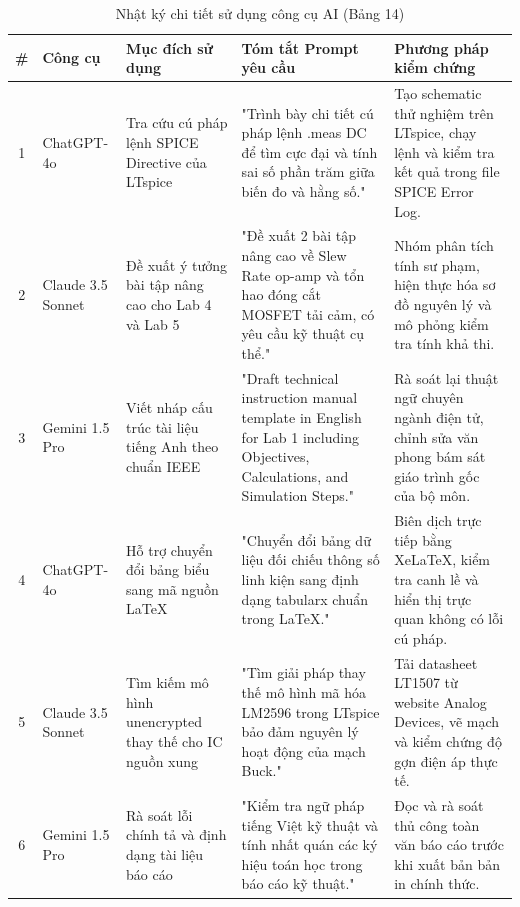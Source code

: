 \documentclass[12pt,a4paper]{report}
\begin{document}
\begin{table}[H]
\centering
\caption{Nhật ký chi tiết sử dụng công cụ AI (Bảng 14)}
\label{tab:ai_log}
\renewcommand{\arraystretch}{1.3}
\small
\begin{tabularx}{\textwidth}{|c|p{2.0cm}|p{3.2cm}|X|p{3.8cm}|}
\hline
\rowcolor{codebg}
\textbf{\#} & \textbf{Công cụ} & \textbf{Mục đích sử dụng} & \textbf{Tóm tắt Prompt yêu cầu} & \textbf{Phương pháp kiểm chứng} \\ \hline
1 & ChatGPT-4o & Tra cứu cú pháp lệnh SPICE Directive của LTspice & "Trình bày chi tiết cú pháp lệnh .meas DC để tìm cực đại và tính sai số phần trăm giữa biến đo và hằng số." & Tạo schematic thử nghiệm trên LTspice, chạy lệnh và kiểm tra kết quả trong file SPICE Error Log. \\ \hline
2 & Claude 3.5 Sonnet & Đề xuất ý tưởng bài tập nâng cao cho Lab 4 và Lab 5 & "Đề xuất 2 bài tập nâng cao về Slew Rate op-amp và tổn hao đóng cắt MOSFET tải cảm, có yêu cầu kỹ thuật cụ thể." & Nhóm phân tích tính sư phạm, hiện thực hóa sơ đồ nguyên lý và mô phỏng kiểm tra tính khả thi. \\ \hline
3 & Gemini 1.5 Pro & Viết nháp cấu trúc tài liệu tiếng Anh theo chuẩn IEEE & "Draft technical instruction manual template in English for Lab 1 including Objectives, Calculations, and Simulation Steps." & Rà soát lại thuật ngữ chuyên ngành điện tử, chỉnh sửa văn phong bám sát giáo trình gốc của bộ môn. \\ \hline
4 & ChatGPT-4o & Hỗ trợ chuyển đổi bảng biểu sang mã nguồn LaTeX & "Chuyển đổi bảng dữ liệu đối chiếu thông số linh kiện sang định dạng tabularx chuẩn trong LaTeX." & Biên dịch trực tiếp bằng XeLaTeX, kiểm tra canh lề và hiển thị trực quan không có lỗi cú pháp. \\ \hline
5 & Claude 3.5 Sonnet & Tìm kiếm mô hình unencrypted thay thế cho IC nguồn xung & "Tìm giải pháp thay thế mô hình mã hóa LM2596 trong LTspice bảo đảm nguyên lý hoạt động của mạch Buck." & Tải datasheet LT1507 từ website Analog Devices, vẽ mạch và kiểm chứng độ gợn điện áp thực tế. \\ \hline
6 & Gemini 1.5 Pro & Rà soát lỗi chính tả và định dạng tài liệu báo cáo & "Kiểm tra ngữ pháp tiếng Việt kỹ thuật và tính nhất quán các ký hiệu toán học trong báo cáo kỹ thuật." & Đọc và rà soát thủ công toàn văn báo cáo trước khi xuất bản bản in chính thức. \\ \hline
\end{tabularx}
\end{table}
\end{document}
